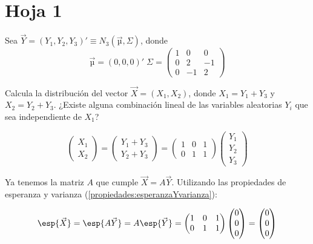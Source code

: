 

\section{Hoja 1}

\begin{problem}[1]
Sea $\vec{Y} = (Y_1,Y_2,Y_3)' ≡ N_3(\vec{µ},Σ)$, donde \[\vec{µ} = (0,0,0)'\;
Σ =\begin{pmatrix}
1&0&0\\
0&2&−1\\
0&−1&2
\end{pmatrix}
\]


\ppart  Calcula la distribución del vector $\vec{X} = (X_1,X_2)$, donde $X_1 = Y_1 + Y_3$ y $X_2 = Y_2 + Y_3$.
\ppart ¿Existe alguna combinación lineal de las variables aleatorias $Y_i$ que sea independiente de $X_1$?

\solution
{}


\spart 
\[
\begin{pmatrix}X_1 \\ X_2 \end{pmatrix} = \begin{pmatrix} Y_1 + Y_3 \\ Y_2 + Y_3 \end{pmatrix} = \begin{pmatrix} 1&0&1\\0&1&1 \end{pmatrix} \begin{pmatrix} Y_1\\Y_2\\Y_3 \end{pmatrix} 
\]

Ya tenemos la matriz $A$ que cumple $\vec{X} = A \vec{Y}$. Utilizando las propiedades de esperanza y varianza (\ref{propiedades:esperanzaYvarianza}):

\[\esp{\vec{X}} = \esp{A\vec{Y}} = A\esp{\vec{Y}} = \begin{pmatrix} 1&0&1\\0&1&1 \end{pmatrix} \begin{pmatrix} 0 \\0\\0\end{pmatrix} = \begin{pmatrix} 0 \\0\\0\end{pmatrix}\]


\end{problem}
